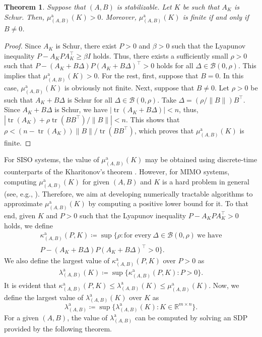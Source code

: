 \documentclass[9pt,shortpaper,twoside,web]{ieeecolor}
\DeclareMathOperator{\tr}{tr}
\newtheorem{theorem}{Theorem}
\begin{document}
\begin{theorem}
\label{prop:Bnonzero}
Suppose that $(A,B)$ is stabilizable. Let $K$ be such that $A_K$ is Schur. Then, $\mu_{(A,B)}^{\text{a}}(K)>0$. Moreover, $\mu_{(A,B)}^{\text{a}}(K)$ is finite \emph{if and only if} $B\neq 0$. 
\end{theorem}
\begin{proof}
Since $A_K$ is Schur, there exist $P>0$ and \mbox{$\beta>0$} such that the Lyapunov inequality \mbox{$P-A_K PA_K^\top \geq\beta I$} holds. Thus, there exists a sufficiently small $\rho>0$ such that \mbox{$P-(A_K+B\Delta) P(A_K+B\Delta)^\top>0$} holds for all \mbox{$\Delta\in\mathcal{B}(0,\rho)$}. This implies that $\mu_{(A,B)}^{\text{a}}(K)>0$. For the rest, first, suppose that $B=0$. In this case, $\mu_{(A,B)}^{\text{a}}(K)$ is obviously not finite. Next, suppose that $B\neq 0$. Let $\rho>0$ be such that $A_K+B\Delta$ is Schur for all $\Delta\in\mathcal{B}(0,\rho)$. Take $\Delta=(\rho /\|B\|)B^\top$. Since $A_K+B\Delta$ is Schur, we have $|\tr(A_K+B\Delta)|< n$, thus,
$\left|\tr(A_K)+\rho\tr(BB^\top)/\|B\|\right|< n$. This shows that $\rho< (n-\tr(A_K))\|B\|/\tr(BB^\top)$, which proves that $\mu_{(A,B)}^{\text{a}}(K)$ is finite. 
\end{proof}

For SISO systems, the value of $\mu_{(A,B)}^{\text{a}}(K)$ may be obtained using discrete-time counterparts of the Kharitonov's theorem \cite{hollot1986some}. However, for MIMO systems, computing $\mu_{(A,B)}^{\text{a}}(K)$ for given $(A,B)$ and $K$ is a hard problem in general (see, e.g., \cite{nemirovskii1993several}). Therefore, we aim at developing numerically tractable algorithms to approximate $\mu_{(A,B)}^{\text{a}}(K)$ by computing a positive lower bound for it. To that end, given $K$ and $P>0$ such that the Lyapunov inequality $P-A_KPA_K^\top>0$ holds, we define 
\begin{equation}
\label{eq:rhoKP}
\begin{split}
\kappa_{(A,B)}^{\text{a}}(P,K)\coloneqq \sup \{\rho:\text{for every}\ \Delta\in\mathcal{B}(0,\rho)\ \text{we have}\\
P-(A_K+B\Delta) P (A_K+B\Delta)^\top>0\}.
\end{split}
\end{equation}
We also define the largest value of $\kappa_{(A,B)}^{\text{a}}(P,K)$ over $P>0$ as
\begin{equation}
\label{eq:rhoK}
\begin{split}
\lambda_{(A,B)}^{\text{a}}(K)\coloneqq \sup\{\kappa_{(A,B)}^{\text{a}}(P,K):P>0\}.
\end{split}
\end{equation}
It is evident that $\kappa_{(A,B)}^{\text{a}}(P,K)\leq\lambda_{(A,B)}^{\text{a}}(K)\leq\mu_{(A,B)}^{\text{a}}(K)$. Now, we define the largest value of $\lambda_{(A,B)}^{\text{a}}(K)$ over $K$ as
\begin{equation}
\label{eq:def_lam_mod}
\lambda_{(A,B)}^{\text{a}}\coloneqq \sup\{\lambda_{(A,B)}^{\text{a}}(K):K\in\mathbb{R}^{m\times n}\}.
\end{equation}
For a given $(A,B)$, the value of $\lambda_{(A,B)}^{\text{a}}$ can be computed by solving an SDP provided by the following theorem.  
\end{document}
